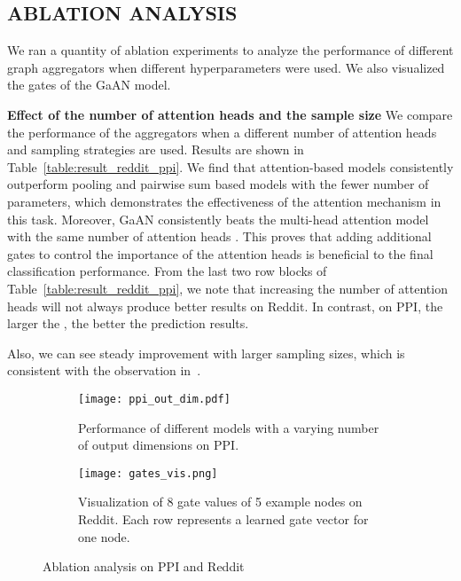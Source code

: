\documentclass{article}
\begin{document}
	
	
	
	\subsection{ABLATION ANALYSIS}
	We ran a quantity of ablation experiments to analyze the performance of different graph aggregators when different hyperparameters were used. We also visualized the gates of the GaAN model.
	
	\textbf{Effect of the number of attention heads and the sample size}\quad
	We compare the performance of the aggregators when a different number of attention heads and sampling strategies are used. Results are shown in Table~\ref{table:result_reddit_ppi}.
	We find that attention-based models consistently outperform pooling and pairwise sum based models with the fewer number of parameters, which demonstrates the effectiveness of the attention mechanism in this task. Moreover, GaAN consistently beats the multi-head attention model with the same number of attention heads . This proves that adding additional gates to control the importance of the attention heads is beneficial to the final classification performance. From the last two row blocks of Table~\ref{table:result_reddit_ppi}, we note that increasing the number of attention heads will not always produce better results on Reddit. In contrast, on PPI, the larger the , the better the prediction results. 

	Also, we can see steady improvement with larger sampling sizes, which is consistent with the observation in~\citep{hamilton2017inductive}.
	
	
	\begin{figure}[tb!]
		\centering
		\begin{subfigure}[b]{0.48\textwidth}
			\centering
			\texttt{[image: ppi\_out\_dim.pdf]}
			\caption{Performance of different models with a varying number of output dimensions on PPI.}\label{fig:ppi_out_dim}
		\end{subfigure}
		\begin{subfigure}[b]{0.48\textwidth}
			\centering
			\texttt{[image: gates\_vis.png]}
			\caption{Visualization of 8 gate values of 5 example nodes on Reddit. Each row represents a learned gate vector for one node.}
			\label{fig:gate_vis}
		\end{subfigure}
\caption{Ablation analysis on PPI and Reddit }
		\label{fig:ppi_ablation}
\end{figure}
	
\end{document}
